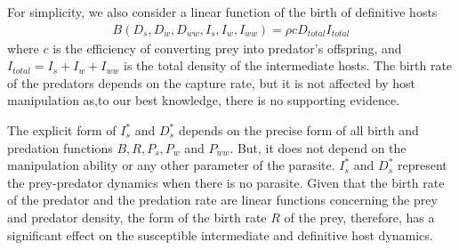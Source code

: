 \documentclass[11pt]{article}
\begin{document}
For simplicity, we also consider a linear function of the birth of definitive hosts
%
\begin{align*}
B(D_s, D_w, D_{ww}, I_s, I_w, I_{ww}) = \rho c D_{total} I_{total}
\end{align*}
%
where $c$ is the efficiency of converting prey into predator's offspring, and $I_{total} = I_s + I_w + I_{ww}$ is the total density of the intermediate hosts.
The birth rate of the predators depends on the capture rate, but it is not affected by host manipulation as,to our best knowledge, there is no supporting evidence.

The explicit form of $I_s^*$ and $D_s^*$ depends on the precise form of all birth and predation functions $B, R, P_s, P_w$ and $P_{ww}$.
But, it does not depend on the manipulation ability or any other parameter of the parasite. 
$I_s^*$ and $D_s^*$ represent the prey-predator dynamics when there is no parasite. 
Given that the birth rate of the predator and the predation rate are linear functions concerning the prey and predator density, the form of the birth rate $R$ of the prey, therefore, has a significant effect on the susceptible intermediate and definitive host dynamics.
\end{document}
